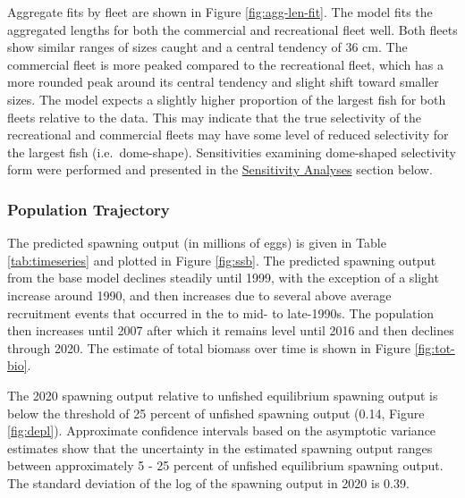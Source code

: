 \documentclass[11pt,
  english,
  a4paper,
]{article}
\begin{document}

Aggregate fits by fleet are shown in Figure \ref{fig:agg-len-fit}. The model fits the aggregated lengths for both the commercial and recreational fleet well. Both fleets show similar ranges of sizes caught and a central tendency of 36 cm. The commercial fleet is more peaked compared to the recreational fleet, which has a more rounded peak around its central tendency and slight shift toward smaller sizes. The model expects a slightly higher proportion of the largest fish for both fleets relative to the data. This may indicate that the true selectivity of the recreational and commercial fleets may have some level of reduced selectivity for the largest fish (i.e.~dome-shape). Sensitivities examining dome-shaped selectivity form were performed and presented in the {\protect\hyperlink{sensitivity-analyses}{Sensitivity Analyses}\leavevmode\tagmcend\tagstructend} section below.

\leavevmode\tagmcend\tagstructend\par


\hypertarget{population-trajectory}{%
\subsubsection{Population Trajectory}\label{population-trajectory}}

\leavevmode\tagmcend\tagstructend


The predicted spawning output (in millions of eggs) is given in Table \ref{tab:timeseries} and plotted in Figure \ref{fig:ssb}. The predicted spawning output from the base model declines steadily until 1999, with the exception of a slight increase around 1990, and then increases due to several above average recruitment events that occurred in the to mid- to late-1990s. The population then increases until 2007 after which it remains level until 2016 and then declines through 2020. The estimate of total biomass over time is shown in Figure \ref{fig:tot-bio}.

\leavevmode\tagmcend\tagstructend\par


The 2020 spawning output relative to unfished equilibrium spawning output is below the threshold of 25 percent of unfished spawning output (0.14, Figure \ref{fig:depl}). Approximate confidence intervals based on the asymptotic variance estimates show that the uncertainty in the estimated spawning output ranges between approximately 5 - 25 percent of unfished equilibrium spawning output. The standard deviation of the log of the spawning output in 2020 is 0.39.
\end{document}
